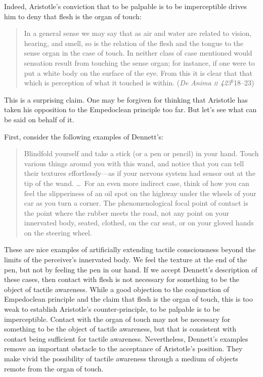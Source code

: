 Indeed, Aristotle's conviction that to be palpable is to be imperceptible drives him to deny that flesh is the organ of touch:
\begin{quote}
    In a general sense we may say that as air and water are related to vision, hearing, and smell, so is the relation of the flesh and the tongue to the sense organ in the case of touch. In neither class of case mentioned would sensation result from touching the sense organ; for instance, if one were to put a white body on the surface of the eye. From this it is clear that that which is perception of what it touched is within. (\emph{De Anima \textsc{ii} 423\( ^{b} \)}18--23)
\end{quote}
This is a surprising claim. One may be forgiven for thinking that Aristotle has taken his opposition to the Empedoclean principle too far. But let's see what can be said on behalf of it.

First, consider the following examples of Dennett's:
\begin{quote}
    Blindfold yourself and take a stick (or a pen or pencil) in your hand. Touch various things around you with this wand, and notice that you can tell their textures effortlessly---as if your nervous system had sensor out at the tip of the wand. \ldots\ For an even more indirect case, think of how you can feel the slipperiness of an oil spot on the highway under the wheels of your car as you turn a corner. The phenomenological focal point of contact is the point where the rubber meets the road, not any point on your innervated body, seated, clothed, on the car seat, or on your gloved hands on the steering wheel. \citep[47]{Dennett:1993ce}
\end{quote}
These are nice examples of artificially extending tactile consciousness beyond the limits of the perceiver's innervated body. We feel the texture at the end of the pen, but not by feeling the pen in our hand. If we accept Dennett's description of these cases, then contact with flesh is not necessary for something to be the object of tactile awareness. While a good objection to the conjunction of Empedoclean principle and the claim that flesh is the organ of touch, this is too weak to establish Aristotle's counter-principle, to be palpable is to be imperceptible. Contact with the organ of touch may not be necessary for something to be the object of tactile awareness, but that is consistent with contact being sufficient for tactile awareness. Nevertheless, Dennett's examples remove an important obstacle to the acceptance of Aristotle's position. They make vivid the possibility of tactile awareness through a medium of objects remote from the organ of touch.

